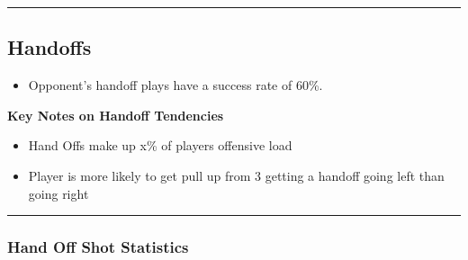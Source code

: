 \documentclass[a4paper,12pt]{article}
\begin{document}
\vspace{-1em} %
\hrule height 1pt width 1\textwidth %
\vspace{1em} %

\clearpage


\subsection{Handoffs}
\begin{itemize}
    \item Opponent's handoff plays have a success rate of 60\%.
\end{itemize}

\vspace{1.25em} %
\textbf{Key Notes on Handoff Tendencies}
\vspace{0.5em} %

\begin{itemize}
    \item Hand Offs make up x\% of players offensive load
    \vspace{0.3em} %
    \item Player is more likely to get pull up from 3 getting a handoff going left than going right
\end{itemize}

\vspace{1em} %
\hrule height 1pt width 1\textwidth %
\vspace{0em} %

\subsubsection{Hand Off Shot Statistics}
\end{document}
